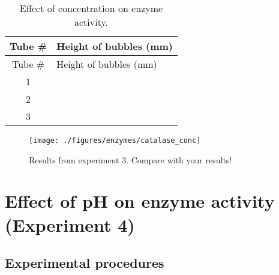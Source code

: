 \begin{longtable}[]{@{}cl@{}}
\caption{\label{tab:concentration} Effect of concentration on enzyme
activity.}\tabularnewline
\toprule
Tube \# & Height of bubbles (mm)\tabularnewline
\midrule
\endfirsthead
\toprule
Tube \# & Height of bubbles (mm)\tabularnewline
\midrule
\endhead
1 &\tabularnewline
2 &\tabularnewline
3 &\tabularnewline
\bottomrule
\end{longtable}

\begin{figure}

{\centering \texttt{[image: ./figures/enzymes/catalase\_conc]} 

}

\caption{Results from experiment 3. Compare with your results!}\label{fig:conc}
\end{figure}

\section{Effect of pH on enzyme activity (Experiment
4)}\label{effect-of-ph-on-enzyme-activity-experiment-4}

\subsection{Experimental procedures}\label{experimental-procedures-23}


